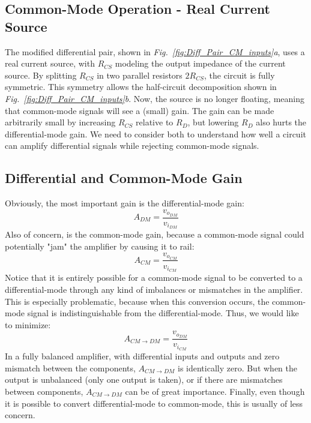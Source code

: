 \subsection{Common-Mode Operation - Real Current Source}
The modified differential pair, shown in \emph{Fig.~\ref{fig:Diff_Pair_CM_inputs}a}, uses a real current source, with $R_{CS}$ modeling the output impedance of the current source.  By splitting $R_{CS}$ in two parallel resistors $2R_{CS}$, the circuit is fully symmetric.  This symmetry allows the half-circuit decomposition shown in \emph{Fig.~\ref{fig:Diff_Pair_CM_inputs}b}.  Now, the source is no longer floating, meaning that common-mode signals will see a (small) gain.  The gain can be made arbitrarily small by increasing $R_{CS}$ relative to $R_D$, but lowering $R_D$ also hurts the differential-mode gain.  We need to consider both to understand how well a circuit can amplify differential signals while rejecting common-mode signals.
\subsection{Differential and Common-Mode Gain}
Obviously, the most important gain is the differential-mode gain:
    \begin{equation}
        A_{DM} = \frac{v_{o_{DM}}}{v_{i_{DM}}}
    \end{equation}
Also of concern, is the common-mode gain, because a common-mode signal could potentially "jam" the amplifier by causing it to rail:
    \begin{equation}
        A_{CM} = \frac{v_{o_{CM}}}{v_{i_{CM}}}
    \end{equation}
Notice that it is entirely possible for a common-mode signal to be converted to a differential-mode through any kind of imbalances or mismatches in the amplifier.  This is especially problematic, because when this conversion occurs, the common-mode signal is indistinguishable from the differential-mode.  Thus, we would like to minimize:
    \begin{equation}
        A_{CM \to DM} = \frac{v_{o_{DM}}}{v_{i_{CM}}}
    \end{equation}
In a fully balanced amplifier, with differential inputs and outputs and zero mismatch between the components, $A_{CM \to DM}$ is identically zero.  But when the output is unbalanced (only one output is taken), or if there are mismatches between components, $A_{CM \to DM}$ can be of great importance.  Finally, even though it is possible to convert differential-mode to common-mode, this is usually of less concern.  
